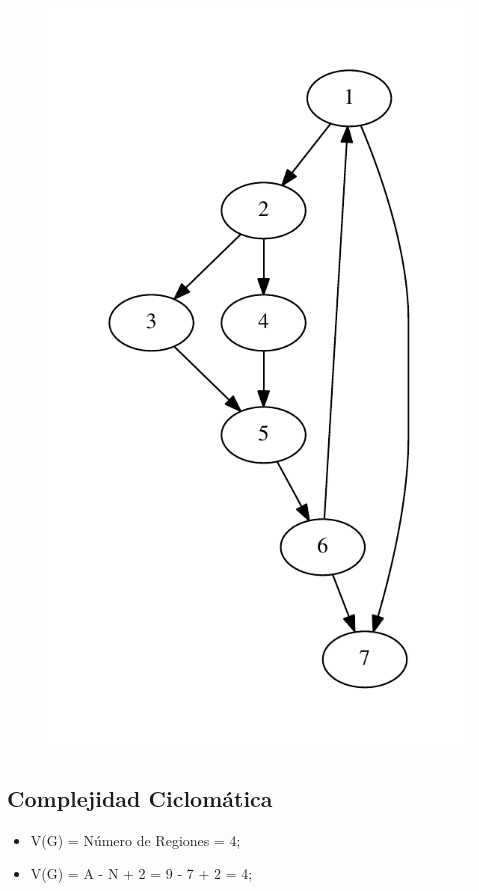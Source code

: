 \documentclass[a4paper,12pt]{article}
\begin{document}
\begin{figure}[h]
 \centering
 \includegraphics[scale = 0.59]{graf1.pdf}
\end{figure}

\subsection{Complejidad Ciclomática}

\begin{itemize}
 \item V(G) = Número de Regiones = 4;
 \item V(G) = A - N + 2 = 9 - 7 + 2 = 4;
\end{itemize}
\end{document}

